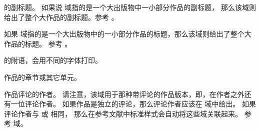 \begin{fieldlist}

 的副标题。
如果说  域指的是一个大出版物中一小部分作品的副标题，
那么该域则给出了整个大作品的副标题。参考 。




如果  域指的是一个大出版物中的一小部分作品的标题，那么该域则给出了整个大作品的标题。
参考 。




 的附语，会用不同的字体打印。




作品的章节或其它单元。




作品评论的作者。
请注意，该域用于那种带评论的作品版本，即，在作者之外还有一位评论作者。
如果作品是独立的评论，那么评论作者应该在  域中给出。
如果评论作者与  或  相同，
那么在参考文献中标准样式会自动将这些域关联起来。
参考  域。




\end{fieldlist}
